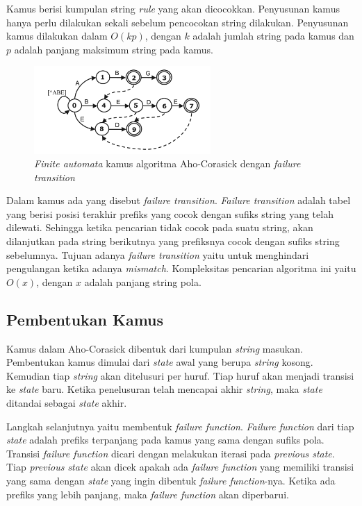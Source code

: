     Kamus berisi kumpulan string \emph{rule} yang akan dicocokkan. Penyusunan kamus hanya perlu dilakukan sekali sebelum pencocokan string dilakukan. Penyusunan kamus dilakukan dalam $O(kp)$, dengan $k$ adalah jumlah string pada kamus dan $p$ adalah panjang maksimum string pada kamus.

    \begin{figure}[htb]
      \centering
      \includegraphics[width=0.6\textwidth]{resources/aho-c.png}
      \caption[\emph{Finite automata} kamus algoritma Aho-Corasick dengan \emph{failure transition}]{\emph{Finite automata} kamus algoritma Aho-Corasick dengan \emph{failure transition} \citep{lin2013}}
    \end{figure}

    Dalam kamus ada yang disebut \emph{failure transition}. \emph{Failure transition} adalah tabel yang berisi posisi terakhir prefiks yang cocok dengan sufiks string yang telah dilewati. Sehingga ketika pencarian tidak cocok pada suatu string, akan dilanjutkan pada string berikutnya yang prefiksnya cocok dengan sufiks string sebelumnya. Tujuan adanya \emph{failure transition} yaitu untuk menghindari pengulangan ketika adanya \emph{mismatch}. Kompleksitas pencarian algoritma ini yaitu $O(x)$, dengan $x$ adalah panjang string pola.

  \subsection {Pembentukan Kamus}

    Kamus dalam Aho-Corasick dibentuk dari kumpulan \emph{string} masukan. Pembentukan kamus dimulai dari \emph{state} awal yang berupa \emph{string} kosong. Kemudian tiap \emph{string} akan ditelusuri per huruf. Tiap huruf akan menjadi transisi ke \emph{state} baru. Ketika penelusuran telah mencapai akhir \emph{string}, maka \emph{state} ditandai sebagai \emph{state} akhir.

    Langkah selanjutnya yaitu membentuk \emph{failure function}. \emph{Failure function} dari tiap \emph{state} adalah prefiks terpanjang pada kamus yang sama dengan sufiks pola. Transisi \emph{failure function} dicari dengan melakukan iterasi pada \emph{previous state}. Tiap \emph{previous state} akan dicek apakah ada \emph{failure function} yang memiliki transisi yang sama dengan \emph{state} yang ingin dibentuk \emph{failure function}-nya. Ketika ada prefiks yang lebih panjang, maka \emph{failure function} akan diperbarui.
    
